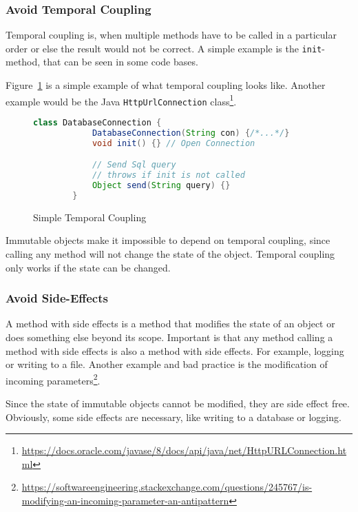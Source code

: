 \subsubsection{Avoid Temporal Coupling}\label{subsubsec:avoid-temporal-coupling}
Temporal coupling is, when multiple methods have to be called in a particular order or else the result would not be correct.
A simple example is the \texttt{init}-method, that can be seen in some code bases.\cite{temporal-coupling}

Figure\ \ref{fig:temporal-coupling} is a simple example of what temporal coupling looks like.
Another example would be the Java \texttt{HttpUrlConnection} class\footnote{\url{https://docs.oracle.com/javase/8/docs/api/java/net/HttpURLConnection.html}}.

\begin{figure}[h]
    \caption{Simple Temporal Coupling}
    \begin{lstlisting}[language=Java,basicstyle=\tiny,label={lst:temporal-coupling}]
        class DatabaseConnection {
            DatabaseConnection(String con) {/*...*/}
            void init() {} // Open Connection

            // Send Sql query
            // throws if init is not called
            Object send(String query) {}
        }
    \end{lstlisting}
    \label{fig:temporal-coupling}
\end{figure}

Immutable objects make it impossible to depend on temporal coupling, since calling any method will not change the state of the object.
Temporal coupling only works if the state can be changed.\cite{elegant-objects}

\subsubsection{Avoid Side-Effects}
A method with side effects is a method that modifies the state of an object or does something else beyond its scope.
Important is that any method calling a method with side effects is also a method with side effects.
For example, logging or writing to a file.
Another example and bad practice is the modification of incoming parameters\footnote{\url{https://softwareengineering.stackexchange.com/questions/245767/is-modifying-an-incoming-parameter-an-antipattern}}.

Since the state of immutable objects cannot be modified, they are side effect free.
Obviously, some side effects are necessary, like writing to a database or logging.\cite{elegant-objects}

